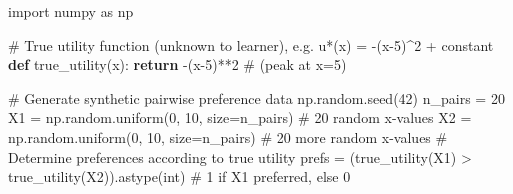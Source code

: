 \documentclass[
  letterpaper,
  numbers=noenddot,
  DIV=11]{scrreprt}
\newenvironment{Shaded}{\begin{snugshade}}{\end{snugshade}}
\newcommand{\BuiltInTok}[1]{\textcolor[rgb]{0.00,0.23,0.31}{#1}}
\newcommand{\CommentTok}[1]{\textcolor[rgb]{0.37,0.37,0.37}{#1}}
\newcommand{\ControlFlowTok}[1]{\textcolor[rgb]{0.00,0.23,0.31}{\textbf{#1}}}
\newcommand{\DecValTok}[1]{\textcolor[rgb]{0.68,0.00,0.00}{#1}}
\newcommand{\ImportTok}[1]{\textcolor[rgb]{0.00,0.46,0.62}{#1}}
\newcommand{\KeywordTok}[1]{\textcolor[rgb]{0.00,0.23,0.31}{\textbf{#1}}}
\newcommand{\NormalTok}[1]{\textcolor[rgb]{0.00,0.23,0.31}{#1}}
\newcommand{\OperatorTok}[1]{\textcolor[rgb]{0.37,0.37,0.37}{#1}}
\theoremstyle{plain}
\theoremstyle{definition}
\theoremstyle{remark}
\begin{document}
\begin{Shaded}
\begin{Highlighting}[numbers=left,,]
\ImportTok{import}\NormalTok{ numpy }\ImportTok{as}\NormalTok{ np}

\CommentTok{\# True utility function (unknown to learner), e.g. u*(x) = {-}(x{-}5)\^{}2 + constant }
\KeywordTok{def}\NormalTok{ true\_utility(x):}
    \ControlFlowTok{return} \OperatorTok{{-}}\NormalTok{(x}\OperatorTok{{-}}\DecValTok{5}\NormalTok{)}\OperatorTok{**}\DecValTok{2}  \CommentTok{\# (peak at x=5)}

\CommentTok{\# Generate synthetic pairwise preference data}
\NormalTok{np.random.seed(}\DecValTok{42}\NormalTok{)}
\NormalTok{n\_pairs }\OperatorTok{=} \DecValTok{20}
\NormalTok{X1 }\OperatorTok{=}\NormalTok{ np.random.uniform(}\DecValTok{0}\NormalTok{, }\DecValTok{10}\NormalTok{, size}\OperatorTok{=}\NormalTok{n\_pairs)  }\CommentTok{\# 20 random x{-}values}
\NormalTok{X2 }\OperatorTok{=}\NormalTok{ np.random.uniform(}\DecValTok{0}\NormalTok{, }\DecValTok{10}\NormalTok{, size}\OperatorTok{=}\NormalTok{n\_pairs)  }\CommentTok{\# 20 more random x{-}values}
\CommentTok{\# Determine preferences according to true utility}
\NormalTok{prefs }\OperatorTok{=}\NormalTok{ (true\_utility(X1) }\OperatorTok{\textgreater{}}\NormalTok{ true\_utility(X2)).astype(}\BuiltInTok{int}\NormalTok{)  }\CommentTok{\# 1 if X1 preferred, else 0}


\end{Highlighting}
\end{Shaded}
\end{document}
